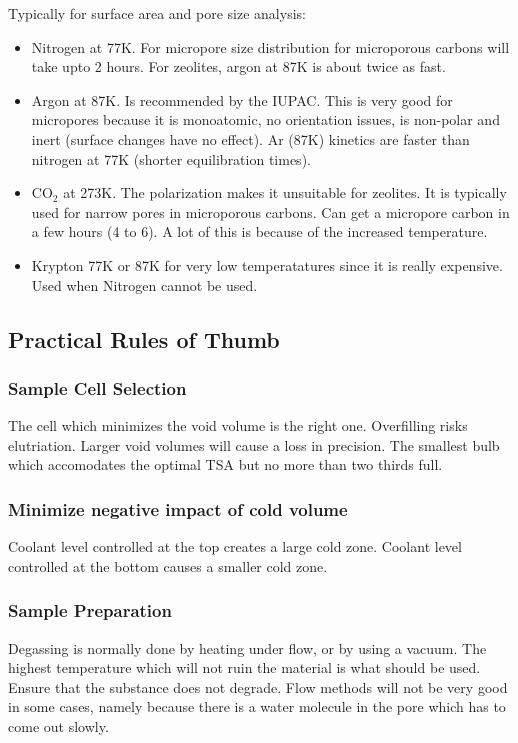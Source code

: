\documentclass[12pt,a4paper,oneside,headinclude]{scrartcl}
\numberwithin{figure}{section}
\numberwithin{equation}{section}
\numberwithin{table}{section}
\begin{document}
Typically for surface area and pore size analysis:
\begin{itemize}
\item Nitrogen at 77K. For micropore size distribution for microporous carbons will
take upto 2 hours. For zeolites, argon at 87K is about twice as fast.
\item Argon at 87K. Is recommended by the IUPAC. This is very good for micropores
because it is monoatomic, no orientation issues, is non-polar and inert
(surface changes have no effect). Ar (87K) kinetics are faster than nitrogen
at 77K (shorter equilibration times).
\item CO\(_2\) at 273K. The polarization makes it unsuitable for zeolites. It is
typically used for narrow pores in microporous carbons. Can get a micropore
carbon in a few hours (4 to 6). A lot of this is because of the increased temperature.
\item Krypton 77K or 87K for very low temperatatures since it is really expensive.
Used when Nitrogen cannot be used.
\end{itemize}
\subsection{Practical Rules of Thumb}
\label{sec:org16a326b}
\subsubsection{Sample Cell Selection}
\label{sec:org534c83d}
The cell which minimizes the void volume is the right one. Overfilling risks
elutriation. Larger void volumes will cause a loss in precision.
 The smallest bulb which accomodates the optimal TSA but no more than two thirds full.
\subsubsection{Minimize negative impact of cold volume}
\label{sec:org6c74ed3}
Coolant level controlled at the top creates a large cold zone. Coolant level
controlled at the bottom causes a smaller cold zone.
\subsubsection{Sample Preparation}
\label{sec:org3c6008b}
Degassing is normally done by heating under flow, or by using a vacuum. The highest temperature which
will not ruin the material is what should be used. Ensure that the substance
does not degrade. Flow methods will not be very good in some cases, namely
because there is a water molecule in the pore which has to come out slowly.
\end{document}

